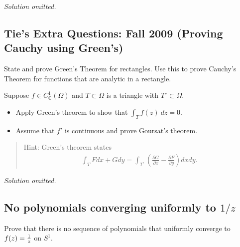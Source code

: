 \emph{Solution omitted.}

\hypertarget{ties-extra-questions-fall-2009-proving-cauchy-using-greens}{%
\subsection{Tie's Extra Questions: Fall 2009 (Proving Cauchy using
Green's)}\label{ties-extra-questions-fall-2009-proving-cauchy-using-greens}}

\begin{problem}[?]

State and prove Green's Theorem for rectangles. Use this to prove
Cauchy's Theorem for functions that are analytic in a rectangle.

\end{problem}

\begin{problem}[Variant]

Suppose \(f\in C_{\mathbb{C}}^1(\Omega)\) and \(T\subset \Omega\) is a
triangle with \(T^\circ \subset \Omega\).

\begin{itemize}
\tightlist
\item
  Apply Green's theorem to show that \(\int_T f(z) ~dz = 0\).
\item
  Assume that \(f'\) is continuous and prove Goursat's theorem.
\end{itemize}

\begin{quote}
Hint: Green's theorem states
\begin{align*}
\int_{T} F d x+G d y=\int_{T^\circ}\left(\frac{\partial G}{\partial x}-\frac{\partial F}{\partial y}\right) d x d y
.\end{align*}
\end{quote}

\end{problem}

\emph{Solution omitted.}

\hypertarget{no-polynomials-converging-uniformly-to-1z}{%
\subsection{\texorpdfstring{No polynomials converging uniformly to
\(1/z\)}{No polynomials converging uniformly to 1/z}}\label{no-polynomials-converging-uniformly-to-1z}}

\begin{problem}[?]

Prove that there is no sequence of polynomials that uniformly converge
to \(f(z) = {1\over z}\) on \(S^1\).

\end{problem}

